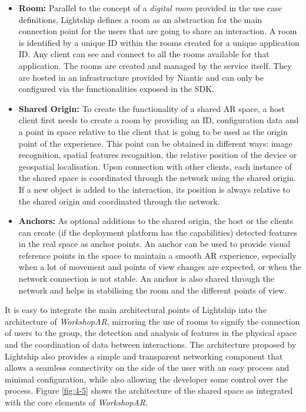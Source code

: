 \begin{itemize}
    \item \textbf{Room:} Parallel to the concept of a \emph{digital room} provided in the use case definitions, Lightship defines a room as an abstraction for the main
    connection point for the users that are going to share an interaction. A room is identified by a unique ID within the rooms created for a unique application ID. Any
    client can see and connect to all the rooms available for that application. The rooms are created and managed by the service itself. They are hosted in an
    infrastructure provided by Niantic and can only be configured via the functionalities exposed in the SDK.
    \item \textbf{Shared Origin:} To create the functionality of a shared \ac{AR} space, a host client first needs to create a room by providing an ID, configuration data
    and a point in space relative to the client that is going to be used as the origin point of the experience. This point can be obtained in different ways: image
    recognition, spatial features recognition, the relative position of the device or geospatial localisation. Upon connection with other clients, each instance of the
    shared space is coordinated through the network using the shared origin. If a new object is added to the interaction, its position is always relative to the shared
    origin and coordinated through the network.
    \item \textbf{Anchors:} As optional additions to the shared origin, the host or the clients can create (if the deployment platform has the capabilities) detected
    features in the real space as anchor points. An anchor can be used to provide visual reference points in the space to maintain a smooth \ac{AR} experience, especially
    when a lot of movement and points of view changes are expected, or when the network connection is not stable. An anchor is also shared through the network and helps in
    stabilising the room and the different points of view.
\end{itemize}

It is easy to integrate the main architectural points of Lightship into the architecture of \emph{WorkshopAR}, mirroring the use of rooms to signify the connection of
users to the group, the detection and analysis of features in the physical space and the coordination of data between interactions. The architecture proposed by Lightship
also provides a simple and transparent networking component that allows a seamless connectivity on the side of the user with an easy process and minimal configuration,
while also allowing the developer some control over the process. Figure \ref{fig:4-5} shows the architecture of the shared space as integrated with the core elements of
\emph{WorkshopAR}.

